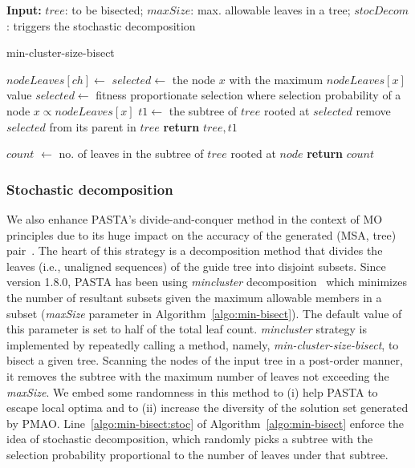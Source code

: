 \documentclass[a4paper,fleqn, review]{cas-dc}
\begin{document}
\begin{algorithm}[!htbp]\scriptsize
	\textbf{Input:} $tree$: to be bisected; $maxSize$: max. allowable leaves in a tree; $stocDecom$: triggers the stochastic decomposition
\begin{algorithmic}[1]
		\caption{min-cluster-size-bisect}
		\label{algo:min-bisect}
		\State $nodeLeaves[ch] \gets $ 
		\EndFor
		\State $selected \gets$ the node $x$ with the maximum $nodeLeaves[x]$ value
		\Else
		\State $selected \gets $ fitness proportionate selection where selection probability of a node $x \propto nodeLeaves[x]$  \label{algo:min-bisect:stoc}
		\EndIf
		\EndIf
		\State $t1 \gets $ the subtree of $tree$ rooted at $selected$
		\State remove $selected$ from its parent in $tree$
		\EndFor
		\State \textbf{return} $tree, t1$
		\Statex

		\State $ count $ $\gets$ no. of leaves in the subtree of $tree$ rooted at $node$
		\State \textbf{return} $ count $
		\EndFunction
	\end{algorithmic}
\end{algorithm}

\subsubsection{Stochastic decomposition}\label{subsec:stocastic}
We also enhance PASTA's divide-and-conquer method in the context of MO principles due to its huge impact on the accuracy of the generated (MSA, tree) pair~\cite{liu2012sate}. The heart of this strategy is a decomposition method that divides the leaves (i.e., unaligned sequences) of the guide tree into disjoint subsets. Since version 1.8.0, PASTA has been using \textit{mincluster} decomposition~\cite{balaban2019treecluster} which minimizes the number of resultant subsets given the maximum allowable members in a subset (\textit{maxSize} parameter in Algorithm~\ref{algo:min-bisect}). The default value of this parameter is set to half of the total leaf count. \textit{mincluster} strategy is implemented by repeatedly calling a method, namely, \textit{min-cluster-size-bisect}, to bisect a given tree. Scanning the nodes of the input tree in a post-order manner, it removes the subtree with the maximum number of leaves not exceeding the \textit{maxSize}. We embed some randomness in this method to (i) help PASTA to escape local optima and to (ii) increase the diversity of the solution set generated by PMAO. Line~\ref{algo:min-bisect:stoc} of Algorithm~\ref{algo:min-bisect} enforce the idea of stochastic decomposition, which randomly picks a subtree with the selection probability proportional to the number of leaves under that subtree.
\end{document}

